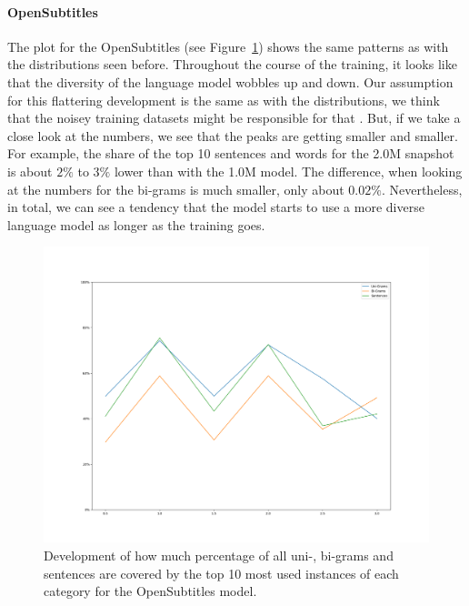 \paragraph{OpenSubtitles} The plot for the OpenSubtitles (see Figure~\ref{results:language_model:diversity:opensubtitles}) shows the same patterns as with the distributions seen before. Throughout the course of the training, it looks like that the diversity of the language model wobbles up and down. Our assumption for this flattering development is the same as with the distributions, we think that the noisey training datasets might be responsible for that . But, if we take a close look at the numbers, we see that the peaks are getting smaller and smaller. For example, the share of the top 10 sentences and words for the 2.0M snapshot is about $2\%$ to $3\%$ lower than with the 1.0M model. The difference, when looking at the numbers for the bi-grams is much smaller, only about $0.02\%$. Nevertheless, in total, we can see a tendency that the model starts to use a more diverse language model as longer as the training goes.

\begin{figure}[H]
	\includegraphics[width=\linewidth]{img/plots/opensubtitles_not_reversed/diversity_perc_plot.png}
	\caption{Development of how much percentage of all uni-, bi-grams and sentences are covered by the top 10 most used instances of each category for the OpenSubtitles model.}
	\label{results:language_model:diversity:opensubtitles}
\end{figure}

